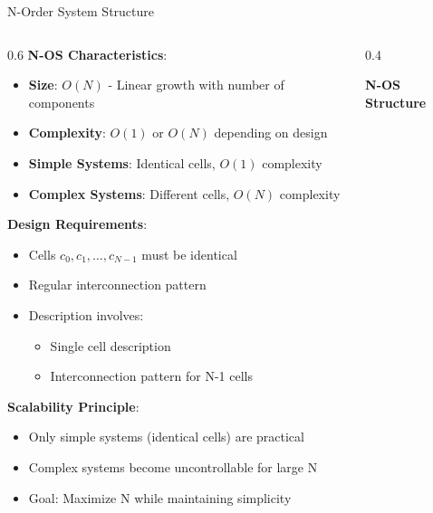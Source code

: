 \documentclass[aspectratio=169]{beamer}
\newcommand{\concept}[1]{\textbf{\color{darkblue}#1}}
\begin{document}
\begin{frame}{N-Order System Structure}
\begin{columns}
\begin{column}{0.6\textwidth}
\concept{N-OS Characteristics}:
\begin{itemize}
\item \textbf{Size}: $O(N)$ - Linear growth with number of components
\item \textbf{Complexity}: $O(1)$ or $O(N)$ depending on design
\item \textbf{Simple Systems}: Identical cells, $O(1)$ complexity
\item \textbf{Complex Systems}: Different cells, $O(N)$ complexity
\end{itemize}

\vspace{0.3cm}
\concept{Design Requirements}:
\begin{itemize}
\item Cells $c_0, c_1, \ldots, c_{N-1}$ must be identical
\item Regular interconnection pattern
\item Description involves:
\begin{itemize}
\item Single cell description
\item Interconnection pattern for N-1 cells
\end{itemize}
\end{itemize}

\vspace{0.3cm}
\concept{Scalability Principle}:
\begin{itemize}
\item Only simple systems (identical cells) are practical
\item Complex systems become uncontrollable for large N
\item Goal: Maximize N while maintaining simplicity
\end{itemize}
\end{column}
\begin{column}{0.4\textwidth}
\begin{center}
\textbf{N-OS Structure}
\vspace{0.3cm}

\end{center}
\end{column}
\end{columns}
\end{frame}
\end{document}
